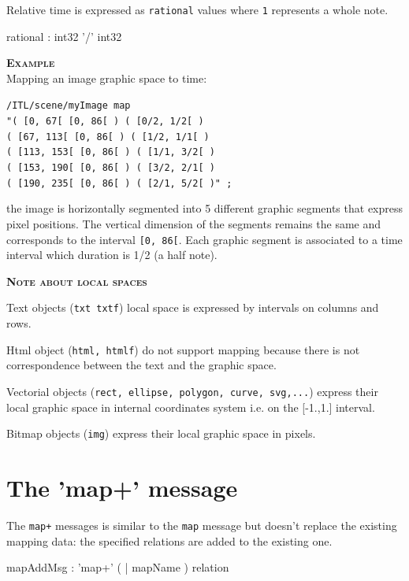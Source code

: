 \documentclass[a4paper,twoside]{report}
\newcommand{\sublevel}[1]	{\section{#1}}
\newcommand{\OSC}[1]		{\texttt{#1}}
\newcommand{\values}[1]		{\texttt{#1}}
\newcommand{\example}		{\textbf{\hspace{-1.5cm}\textbf{\textsc{Example }}}}
\newcommand{\note}	[1]		{\vspace{2mm}\textbf{\hspace{-0.9cm}\textbf{\textsc{Note #1}}}}
\let\olditemize\itemize
\let\oldenditemize\enditemize
\renewenvironment{itemize} 	{\olditemize \setlength{\itemsep}{1mm}}{\oldenditemize}
\newcommand{\sample}	[1]			{\vspace{-2mm}\begin{center}\colorbox{mygrey}{
								\begin{minipage}[t]{0.9\columnwidth} 
								{\small \texttt{#1}}
								\end{minipage}}\end{center}}
\begin{document}
Relative time is expressed as \OSC{rational} values where \values{1} represents a whole note.

\begin{rail}
rational : int32 '/' int32
\end{rail}

\example \\
Mapping an image graphic space to time:
\sample{/ITL/scene/myImage map \\
\hspace*{1cm}"( [0, 67[    [0, 86[ ) ( [0/2, 1/2[ ) \\
\hspace*{1.15cm}( [67, 113[  [0, 86[ ) ( [1/2, 1/1[ ) \\
\hspace*{1.15cm}( [113, 153[ [0, 86[ ) ( [1/1, 3/2[ ) \\
\hspace*{1.15cm}( [153, 190[ [0, 86[ ) ( [3/2, 2/1[ ) \\
\hspace*{1.15cm}( [190, 235[ [0, 86[ ) ( [2/1, 5/2[ )" ;
}
the image is horizontally segmented into 5 different graphic segments that express pixel positions. The vertical dimension of the segments remains the same and corresponds to the interval \values{[0, 86[}. Each graphic segment is associated to a time interval which duration is 1/2 (a half note).

\note{about local spaces}
\begin{itemize}
\item Text objects (\OSC{txt txtf}) local space is expressed by intervals on columns and rows.
\item Html object (\OSC{html, htmlf}) do not support mapping because there is not correspondence between the text and the graphic space.
\item Vectorial objects (\OSC{rect, ellipse, polygon, curve, svg,...}) express their local graphic space in internal coordinates system i.e. on the [-1.,1.] interval.
\item Bitmap objects (\OSC{img}) express their local graphic space in pixels.
\end{itemize}


\sublevel{The 'map+' message}
\label{mapAddMsg}
The \OSC{map+} messages is similar to the \OSC{map} message but doesn't replace the existing mapping data: the specified relations are added to the existing one.

\begin{rail}
mapAddMsg : 'map+' ( | mapName ) relation
\end{rail}
\end{document}
